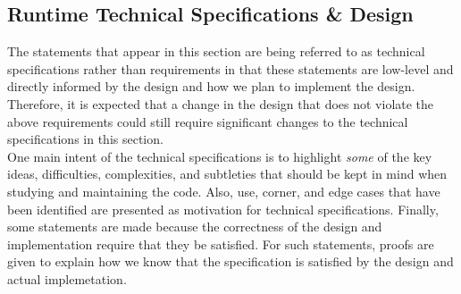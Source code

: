 \documentclass{article}
\begin{document}
\subsection{Runtime Technical Specifications \& Design}
The statements that appear in this section are being referred to as technical
specifications rather than requirements in that these statements are low-level
and directly informed by the design and how we plan to implement the design.
Therefore, it is expected that a change in the design that does not violate the
above requirements could still require significant changes to the technical
specifications in this section.\\

One main intent of the technical specifications is to highlight \textit{some} of
the key ideas, difficulties, complexities, and subtleties that should be kept in
mind when studying and maintaining the code.  Also, use, corner, and edge cases
that have been identified are presented as motivation for technical
specifications.  Finally, some statements are made because the correctness of
the design and implementation require that they be satisfied.  For such
statements, proofs are given to explain how we know that the specification is
satisfied by the design and actual implemetation.

\end{document}
